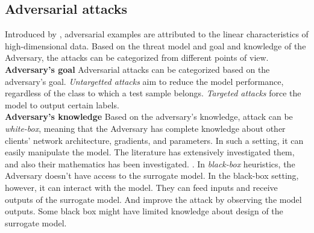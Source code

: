  




\subsection{Adversarial attacks }

Introduced by \cite{szegedy2013intriguing}, adversarial examples are attributed to the linear characteristics of high-dimensional data. \cite{goodfellow2014explaining} Based on the threat model and goal and knowledge of the Adversary, the attacks can be categorized from different points of view.
\\\textbf{Adversary's goal} Adversarial attacks can be categorized based on the adversary's goal. \textit{Untargetted attacks} aim to reduce the model performance,  regardless of the class to which a test sample belongs. \textit{Targeted attacks} force the model to output certain labels.
\\\textbf{Adversary's knowledge} Based on the adversary's knowledge, attack can be  \textit{white-box},
meaning that the Adversary has complete knowledge about other clients' network architecture, gradients, and parameters. In such a setting, it can easily manipulate the model. The literature has extensively investigated them, and also their mathematics has been investigated.\cite{tramer2017ensemble} \cite{xu2020adversarial}. In \textit{black-box} heuristics, the Adversary doesn't have access to the surrogate model. In the black-box setting, however, it can interact with the model. They can feed inputs and receive outputs of the surrogate model. And improve the attack by observing the model outputs. Some black box might have limited knowledge about design of the surrogate model.\cite{yue2021black,9000972,cheng2019improving}




